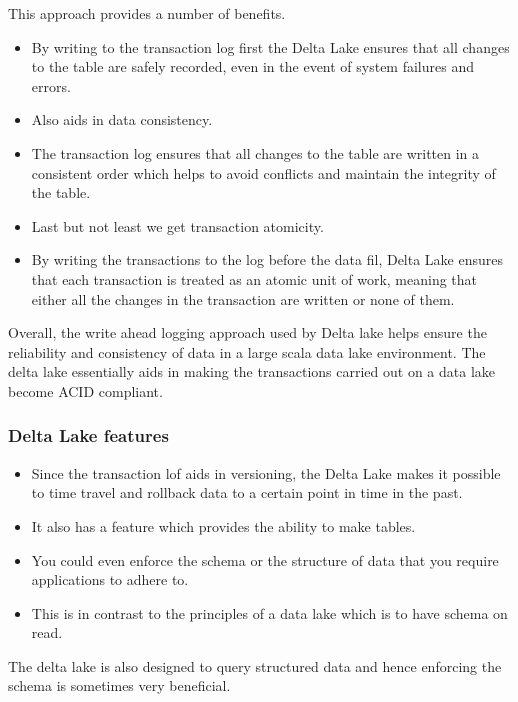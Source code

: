 This approach provides a number of benefits.
\begin{itemize}
    \item By writing to the transaction log first the Delta Lake ensures that all changes to the table are safely recorded, even in the event of system failures and errors.
    \item Also aids in data consistency.
    \item The transaction log ensures that all changes to the table are written in a consistent order which helps to avoid conflicts and maintain the integrity of the table.
    \item Last but not least we get transaction atomicity.
    \item By writing the transactions to the log before the data fil, Delta Lake ensures that each transaction is treated as an atomic unit of work, meaning that either all the changes in the transaction are written or none of them.
\end{itemize}

Overall, the write ahead logging approach used by Delta lake helps ensure the reliability and consistency of data in a large scala data lake environment.
The delta lake essentially aids in making the transactions carried out on a data lake become ACID compliant.

\subsubsection{Delta Lake features}
\begin{itemize}
    \item Since the transaction lof aids in versioning, the Delta Lake makes it possible to time travel and rollback data to a certain point in time in the past.
    \item It also has a feature which provides the ability to make tables.
    \item You could even enforce the schema or the structure of data that you require applications to adhere to.
    \item This is in contrast to the principles of a data lake which is to have schema on read.
\end{itemize}

\begin{note}
    The delta lake is also designed to query structured data and hence enforcing the schema is sometimes very beneficial.
\end{note}

